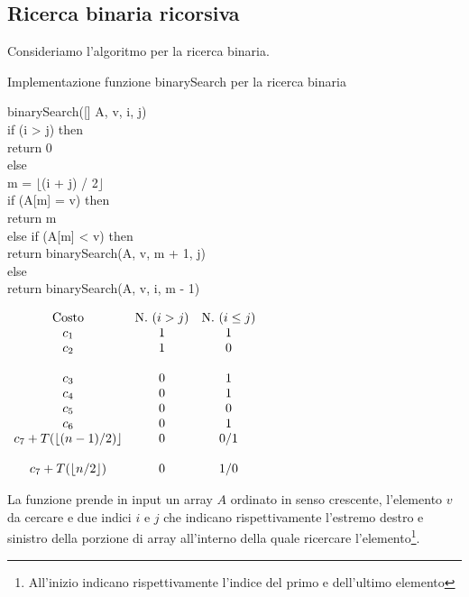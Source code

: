 \subsection{Ricerca binaria ricorsiva}
Consideriamo l'algoritmo per la ricerca binaria.
\begin{code}{Implementazione funzione binarySearch per la ricerca binaria}
\begin{minipage}[t]{0.55\textwidth}
    \footnotesize
    \ind{} binarySearch([] A,  v,  i,  j)\\
    \indf if (i > j) then\\
        return 0\\
    \indf else\\
         m = $\lfloor$(i + j) / 2$\rfloor$\\
        \indff if (A[m] = v) then\\
            return m\\
        \indff else if (A[m] < v) then\\
            return binarySearch(A, v, m + 1, j)\\
        \indff else\\
            return binarySearch(A, v, i, m - 1)\\
\end{minipage}
\hfill
\begin{minipage}[t]{0.43\textwidth}
    \footnotesize
    $\begin{array}[t]{ccc}
        \text{Costo} & \text{N. }(i>j) & \text{N. }(i\leq j)\\
        c_1 & 1 & 1\\
        c_2 & 1 & 0\\
        \\
        c_3 & 0 & 1\\
        c_4 & 0 & 1\\
        c_5 & 0 & 0\\
        c_6 & 0 & 1\\
        c_7+T(\lfloor(n-1)/2)\rfloor & 0 & 0/1\\
        \\
        c_7+T(\lfloor n/2\rfloor) & 0 & 1/0
    \end{array}$
\end{minipage}
\end{code}\noindent
La funzione prende in input un array $A$ ordinato in senso crescente, l'elemento
$v$ da cercare e due indici $i$ e $j$ che indicano rispettivamente l'estremo
destro e sinistro della porzione di array all'interno della quale ricercare
l'elemento\footnote{All'inizio indicano rispettivamente l'indice del primo e
dell'ultimo elemento}.

